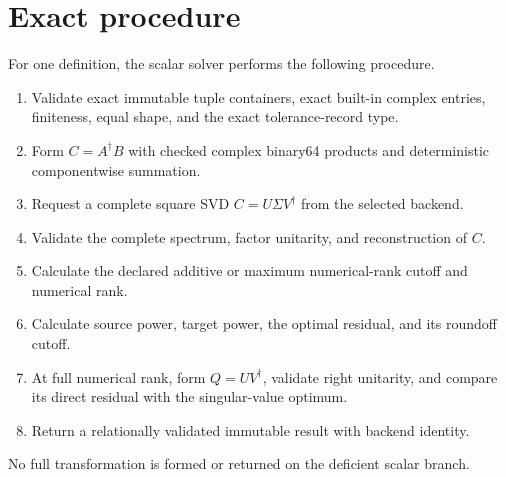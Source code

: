 \section{Exact procedure}
For one definition, the scalar solver performs the following procedure.
\begin{enumerate}
  \item Validate exact immutable tuple containers, exact built-in complex entries,
        finiteness, equal shape, and the exact tolerance-record type.
  \item Form $C=A^\dagger B$ with checked complex binary64 products and deterministic
        componentwise summation.
  \item Request a complete square SVD $C=U\Sigma V^\dagger$ from the selected backend.
  \item Validate the complete spectrum, factor unitarity, and reconstruction of $C$.
  \item Calculate the declared additive or maximum numerical-rank cutoff and numerical
        rank.
  \item Calculate source power, target power, the optimal residual, and its roundoff
        cutoff.
  \item At full numerical rank, form $Q=UV^\dagger$, validate right unitarity, and
        compare its direct residual with the singular-value optimum.
  \item Return a relationally validated immutable result with backend identity.
\end{enumerate}
No full transformation is formed or returned on the deficient scalar branch.

